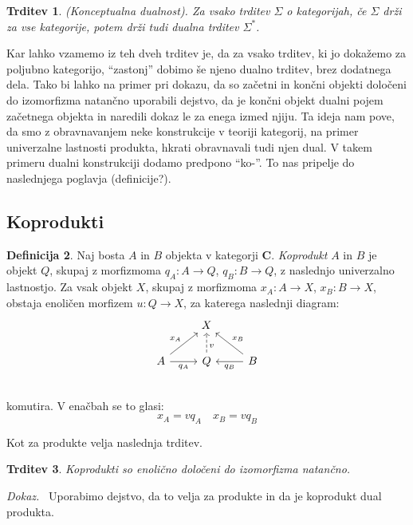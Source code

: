 \documentclass[12pt,a4paper]{book}
\theoremstyle{definition}
\newtheorem{definicija}{Definicija}[chapter]
\theoremstyle{plain}
\newtheorem{trditev}[definicija]{Trditev}
\newenvironment{dokaz}{\emph{Dokaz.}\ }{\hspace{\fill}{$\Box$}}
\theoremstyle{definition}
\theoremstyle{remark}
\newcommand{\cat}[1]{\textbf{#1}}
\begin{document}
\begin{trditev} \textit{(Konceptualna dualnost)}.
Za vsako trditev $\Sigma$ o kategorijah, če $\Sigma$ drži za vse kategorije, potem drži tudi dualna trditev $\Sigma^*$.
\end{trditev}

Kar lahko vzamemo iz teh dveh trditev je, da za vsako trditev, ki jo dokažemo za poljubno kategorijo, "`zastonj"' dobimo še njeno dualno trditev, brez dodatnega dela. Tako bi lahko na primer pri dokazu, da so začetni in končni objekti določeni do izomorfizma natančno uporabili dejstvo, da je končni objekt dualni pojem začetnega objekta in naredili dokaz le za enega izmed njiju.
Ta ideja nam pove, da smo z obravnavanjem neke konstrukcije v teoriji kategorij, na primer univerzalne lastnosti produkta, hkrati obravnavali tudi njen dual. V takem primeru dualni konstrukciji dodamo predpono "`ko-"'. To nas pripelje do naslednjega poglavja (definicije?).

\subsection{Koprodukti}
\begin{definicija}
Naj bosta $A$ in $B$ objekta v kategorji $\cat{C}$. \emph{Koprodukt} $A$ in $B$ je objekt $Q$, skupaj z morfizmoma $q_A : A \to Q$, $q_B : B \to Q$, z naslednjo univerzalno lastnostjo. Za vsak objekt $X$, skupaj z morfizmoma $x_A : A \to X$, $x_B : B \to X$, obstaja enoličen morfizem $u : Q \to X$, za katerega naslednji diagram:
%
$$\begin{tikzcd}
& X & \\
A \ar[ur, "x_A"] \ar[r, "q_A"'] & Q \ar[u, dashed, pos=0.35, "v"']  & B \ar[l, "q_B"] \ar[ul, "x_B"'] \\
\end{tikzcd}$$
komutira. V enačbah se to glasi:
$$x_A = v q_A \quad x_B = v q_B$$
\end{definicija}
Kot za produkte velja naslednja trditev.
\begin{trditev}
Koprodukti so enolično določeni do izomorfizma natančno.
\end{trditev}
\begin{dokaz}
Uporabimo dejstvo, da to velja za produkte in da je koprodukt dual produkta.
\end{dokaz}
\end{document}
